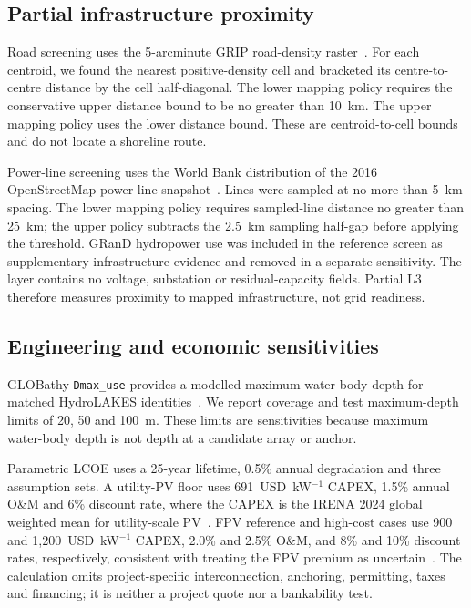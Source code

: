 \subsection{Partial infrastructure proximity}

Road screening uses the 5-arcminute GRIP road-density raster~\citep{meijer2018grip}. For each centroid, we found the nearest positive-density cell and bracketed its centre-to-centre distance by the cell half-diagonal. The lower mapping policy requires the conservative upper distance bound to be no greater than 10~km. The upper mapping policy uses the lower distance bound. These are centroid-to-cell bounds and do not locate a shoreline route.

Power-line screening uses the World Bank distribution of the 2016 OpenStreetMap power-line snapshot~\citep{worldbankTransmission2023}. Lines were sampled at no more than 5~km spacing. The lower mapping policy requires sampled-line distance no greater than 25~km; the upper policy subtracts the 2.5~km sampling half-gap before applying the threshold. GRanD hydropower use was included in the reference screen as supplementary infrastructure evidence and removed in a separate sensitivity. The layer contains no voltage, substation or residual-capacity fields. Partial L3 therefore measures proximity to mapped infrastructure, not grid readiness.

\subsection{Engineering and economic sensitivities}

GLOBathy \texttt{Dmax\_use} provides a modelled maximum water-body depth for matched HydroLAKES identities~\citep{khazaei2022globathy}. We report coverage and test maximum-depth limits of 20, 50 and 100~m. These limits are sensitivities because maximum water-body depth is not depth at a candidate array or anchor.

Parametric LCOE uses a 25-year lifetime, 0.5\% annual degradation and three assumption sets. A utility-PV floor uses 691~USD~kW$^{-1}$ CAPEX, 1.5\% annual O\&M and 6\% discount rate, where the CAPEX is the IRENA 2024 global weighted mean for utility-scale PV~\citep{irena2025costs}. FPV reference and high-cost cases use 900 and 1{,}200~USD~kW$^{-1}$ CAPEX, 2.0\% and 2.5\% O\&M, and 8\% and 10\% discount rates, respectively, consistent with treating the FPV premium as uncertain~\citep{niccolai2024}. The calculation omits project-specific interconnection, anchoring, permitting, taxes and financing; it is neither a project quote nor a bankability test.

